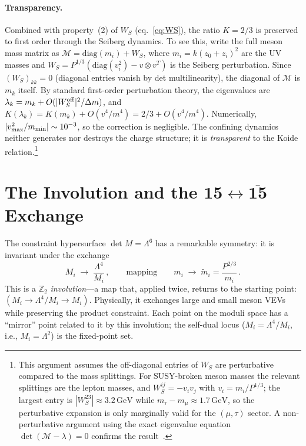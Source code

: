 \documentclass[12pt,a4paper]{article}
\makeatletter
\newcommand{\diag}{\mathrm{diag}}
\newcommand{\GeV}{\,\mathrm{GeV}}
\newcommand{\ie}{i.e.\@}
\makeatother
\begin{document}
\paragraph{Transparency.}
Combined with property~(2) of $W_S$ (eq.~\ref{eq:WS}), the ratio
$K=2/3$ is preserved to first order through the Seiberg dynamics.
To see this, write the full meson mass matrix as
$\mathcal{M} = \diag(m_i) + W_S$, where $m_i = k(z_0{+}z_i)^2$
are the UV masses and $W_S = P^{1/3}(\diag(v_i^2) - v\otimes v^T)$
is the Seiberg perturbation. Since $(W_S)_{kk} = 0$ (diagonal entries
vanish by det multilinearity), the diagonal of $\mathcal{M}$ is
$m_k$ itself. By standard first-order perturbation theory,
the eigenvalues are $\lambda_k = m_k + O(|W_S^{\rm off}|^2/\Delta m)$,
and $K(\lambda_k) = K(m_k) + O(v^4/m^4) = 2/3 + O(v^4/m^4)$.
Numerically, $|v^2_{\rm max}/m_{\rm min}| \sim 10^{-3}$,
so the correction is negligible. The confining dynamics
neither generates nor destroys the charge structure; it is
\emph{transparent} to the Koide relation.\footnote{This
argument assumes the off-diagonal entries of $W_S$ are perturbative
compared to the mass splittings. For SUSY-broken meson masses the
relevant splittings are the lepton masses, and $W_S^{ij} = -v_iv_j$
with $v_i = m_i/P^{1/3}$; the largest entry is
$|W_S^{23}| \approx 3.2\GeV$ while $m_\tau - m_\mu \approx 1.7\GeV$,
so the perturbative expansion is only marginally valid for the
$(\mu,\tau)$ sector. A non-perturbative argument using the
exact eigenvalue equation $\det(\mathcal{M} - \lambda) = 0$ confirms
the result~\cite{Rivero:2024epjc}.}


\section{The Involution and the
  $\mathbf{15} \leftrightarrow \overline{\mathbf{15}}$ Exchange}
\label{sec:involution}

The constraint hypersurface $\det M = \Lambda^6$ has a remarkable
symmetry: it is invariant under the exchange
\begin{equation}
  M_i \;\to\; \frac{\Lambda^4}{M_i}\,,
  \qquad\text{mapping}\qquad
  m_i \;\to\; \tilde{m}_i = \frac{P^{2/3}}{m_i}\,.
  \label{eq:involution}
\end{equation}
This is a $\mathbb{Z}_2$ \emph{involution}---a map that, applied
twice, returns to the starting point: $(M_i \to \Lambda^4/M_i
\to M_i)$. Physically, it exchanges large and small meson VEVs
while preserving the product constraint. Each point on the moduli
space has a ``mirror'' point related to it by this involution;
the self-dual locus ($M_i = \Lambda^4/M_i$, \ie,
$M_i = \Lambda^2$) is the fixed-point set.
\end{document}
